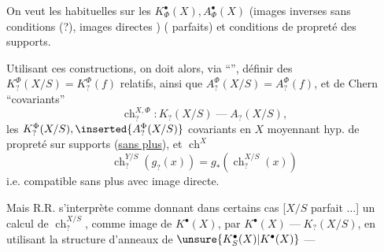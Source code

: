 
On veut les  habituelles  sur les \(K^\bullet_\Phi(X), A^\bullet_\Phi(X)\) (images inverses sans conditions (?), images directes  ) ( parfaits) et conditions de propreté des supports.

Utilisant ces constructions, on doit alors, via ``'', définir des \(K^{\Phi}_{?}(X/S)=K^{\Phi}_{?}(f)\)  relatifs, ainsi que \(A^{\Phi}_{?}(X/S)=A^{\Phi}_{?}(f)\), et   de Chern ``covariants'' 
\[
\operatorname{ch}^{X,\Phi}_{?}:K_{?}(X/S)\mathbin{\text{---}}A_{?}(X/S),
\]
 les \(K^{\Phi}_{?}(X/S),\inserted{A^{\Phi}_{?}(X/S)}\) covariants en \(X\) moyennant hyp. de propreté sur supports (\uline{sans plus}), et \(\operatorname{ch}^{X}\) 
\[
\operatorname{ch}^{Y/S}_{?}(g_{?}(x))=g_*(\operatorname{ch}^{X/S}_{?}(x))
\]
\deleted{\[
\unsure{f^X_*}(\qquad g_{?}(\operatorname{ch}^{X}_{?}(x))=\operatorname{ch}^{\unsure{Y}}_{?}(
\]}
i.e. compatible sans plus avec image directe.

Mais R.R. s'interprète comme donnant dans certains cas [\(X/S\) parfait \(\ldots\)] un calcul de  \(\operatorname{ch}^{X/S}_{?}\), comme image
de \(K^\bullet(X)\), par \(K^\bullet(X)\mathbin{\text{---}}K_{?}(X/S)\), en utilisant la structure d'anneaux de \(\unsure{K^\bullet_S(X)|K^\bullet(X)}\) \(\mathbin{\text{---}}\)



